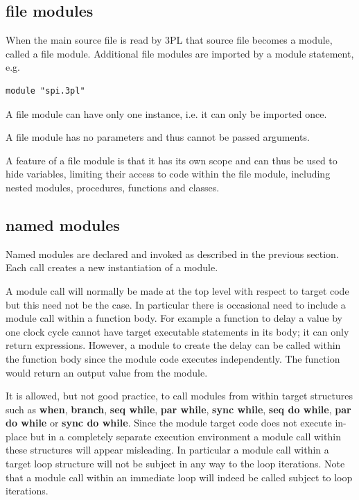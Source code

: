         \subsection{file modules}

            When the main source file is read by 3PL that source file becomes
            a module, called a file module.
            Additional file modules are imported by a module statement, e.g.
            \begin{lstlisting}[gobble=12, language=threepl]
                module "spi.3pl"
            \end{lstlisting}
            A file module can have only one instance, i.e. it can only be imported
            once.
            
            A file module has no parameters and thus cannot be
            passed arguments.
            
            A feature of a file module is that it has its own scope and can thus
            be used to hide variables, limiting their access to code within the
            file module, including nested modules, procedures, functions and
            classes.


        \subsection{named modules}

            Named modules are declared and invoked as described in the
            previous section. Each call creates a new instantiation of a
            module.
            
            A module call will normally be made at the top level with respect to
            target code but this need not be the case. In particular there
            is occasional need to include a module call within a function
            body. For example a function to delay a value by one clock cycle
            cannot have target executable statements in its body; it
            can only return expressions. However, a module to create the delay can
            be called within the function body since the module
            code executes independently. The function would return an
            output value from the module.
            
            It is allowed, but not good practice, to call modules from within
            target structures such as {\bf when}, {\bf branch}, {\bf seq while},
            {\bf par while}, {\bf sync while}, {\bf seq do while}, {\bf par do
            while} or {\bf sync do while}. Since the module target code does not
            execute in-place but in a completely separate execution environment a
            module call within these structures will appear misleading. In
            particular a module call within a target loop structure will not be
            subject in any way to the loop iterations. Note that a module call
            within an immediate loop will indeed be called subject to loop
            iterations.
                        

